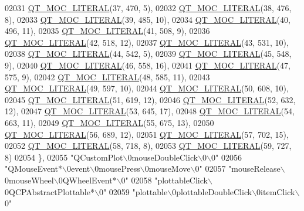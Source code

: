 \begin{DoxyCode}
02031 \hyperlink{a00016_a75bb9482d242cde0a06c9dbdc6b83abe}{QT\_MOC\_LITERAL}(37, 470, 5),
02032 \hyperlink{a00016_a75bb9482d242cde0a06c9dbdc6b83abe}{QT\_MOC\_LITERAL}(38, 476, 8),
02033 \hyperlink{a00016_a75bb9482d242cde0a06c9dbdc6b83abe}{QT\_MOC\_LITERAL}(39, 485, 10),
02034 \hyperlink{a00016_a75bb9482d242cde0a06c9dbdc6b83abe}{QT\_MOC\_LITERAL}(40, 496, 11),
02035 \hyperlink{a00016_a75bb9482d242cde0a06c9dbdc6b83abe}{QT\_MOC\_LITERAL}(41, 508, 9),
02036 \hyperlink{a00016_a75bb9482d242cde0a06c9dbdc6b83abe}{QT\_MOC\_LITERAL}(42, 518, 12),
02037 \hyperlink{a00016_a75bb9482d242cde0a06c9dbdc6b83abe}{QT\_MOC\_LITERAL}(43, 531, 10),
02038 \hyperlink{a00016_a75bb9482d242cde0a06c9dbdc6b83abe}{QT\_MOC\_LITERAL}(44, 542, 5),
02039 \hyperlink{a00016_a75bb9482d242cde0a06c9dbdc6b83abe}{QT\_MOC\_LITERAL}(45, 548, 9),
02040 \hyperlink{a00016_a75bb9482d242cde0a06c9dbdc6b83abe}{QT\_MOC\_LITERAL}(46, 558, 16),
02041 \hyperlink{a00016_a75bb9482d242cde0a06c9dbdc6b83abe}{QT\_MOC\_LITERAL}(47, 575, 9),
02042 \hyperlink{a00016_a75bb9482d242cde0a06c9dbdc6b83abe}{QT\_MOC\_LITERAL}(48, 585, 11),
02043 \hyperlink{a00016_a75bb9482d242cde0a06c9dbdc6b83abe}{QT\_MOC\_LITERAL}(49, 597, 10),
02044 \hyperlink{a00016_a75bb9482d242cde0a06c9dbdc6b83abe}{QT\_MOC\_LITERAL}(50, 608, 10),
02045 \hyperlink{a00016_a75bb9482d242cde0a06c9dbdc6b83abe}{QT\_MOC\_LITERAL}(51, 619, 12),
02046 \hyperlink{a00016_a75bb9482d242cde0a06c9dbdc6b83abe}{QT\_MOC\_LITERAL}(52, 632, 12),
02047 \hyperlink{a00016_a75bb9482d242cde0a06c9dbdc6b83abe}{QT\_MOC\_LITERAL}(53, 645, 17),
02048 \hyperlink{a00016_a75bb9482d242cde0a06c9dbdc6b83abe}{QT\_MOC\_LITERAL}(54, 663, 11),
02049 \hyperlink{a00016_a75bb9482d242cde0a06c9dbdc6b83abe}{QT\_MOC\_LITERAL}(55, 675, 13),
02050 \hyperlink{a00016_a75bb9482d242cde0a06c9dbdc6b83abe}{QT\_MOC\_LITERAL}(56, 689, 12),
02051 \hyperlink{a00016_a75bb9482d242cde0a06c9dbdc6b83abe}{QT\_MOC\_LITERAL}(57, 702, 15),
02052 \hyperlink{a00016_a75bb9482d242cde0a06c9dbdc6b83abe}{QT\_MOC\_LITERAL}(58, 718, 8),
02053 \hyperlink{a00016_a75bb9482d242cde0a06c9dbdc6b83abe}{QT\_MOC\_LITERAL}(59, 727, 8)
02054     \},
02055     \textcolor{stringliteral}{"QCustomPlot\(\backslash\)0mouseDoubleClick\(\backslash\)0\(\backslash\)0"}
02056     \textcolor{stringliteral}{"QMouseEvent*\(\backslash\)0event\(\backslash\)0mousePress\(\backslash\)0mouseMove\(\backslash\)0"}
02057     \textcolor{stringliteral}{"mouseRelease\(\backslash\)0mouseWheel\(\backslash\)0QWheelEvent*\(\backslash\)0"}
02058     \textcolor{stringliteral}{"plottableClick\(\backslash\)0QCPAbstractPlottable*\(\backslash\)0"}
02059     \textcolor{stringliteral}{"plottable\(\backslash\)0plottableDoubleClick\(\backslash\)0itemClick\(\backslash\)0"}

\end{DoxyCode}
